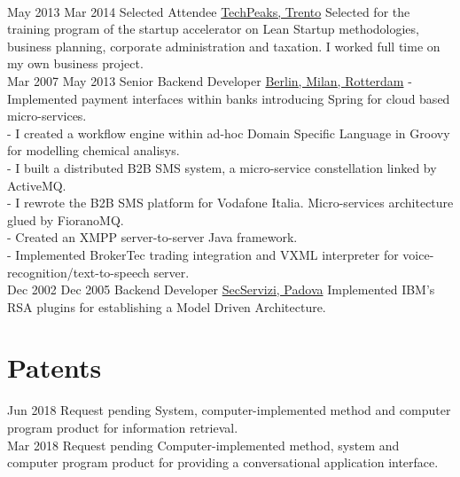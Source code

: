 \documentclass[letterpaper]{twentysecondcv} %
\begin{document}
\begin{twenty}
{{    }
        }
     \\
     \twentyitem
   		{May 2013}
		{Mar 2014}
        {Selected Attendee}
        {\href{https://www.repubblica.it/rubriche/startup-stories/2013/12/02/news/incubatore_startup-72502909/}{TechPeaks, Trento}}
        {}
        {
Selected for the training program of the startup accelerator on Lean Startup methodologies, business planning, corporate administration and taxation. I worked full time on my own business project.
    	}
    	\\
     \twentyitem
   		{Mar 2007}
		{May 2013}
        {Senior Backend Developer}
        {\href{}{Berlin, Milan, Rotterdam}}
        {}
        {
- Implemented payment interfaces within banks introducing Spring for cloud based micro-services.
        \\
- I created a workflow engine within ad-hoc Domain Specific Language in Groovy for modelling chemical analisys.
        \\
- I built a distributed B2B SMS system, a micro-service constellation linked by ActiveMQ.
        \\
- I rewrote the B2B SMS platform for Vodafone Italia. Micro-services architecture glued by FioranoMQ.
        \\
- Created an XMPP server-to-server Java framework.
        \\
- Implemented BrokerTec trading integration and VXML interpreter for  voice-recognition/text-to-speech server.
	}
   	\\
     \twentyitem
   		{Dec 2002}
		{Dec 2005}
        {Backend Developer}
        {\href{}{SecServizi, Padova}}
        {}
        {
    Implemented IBM's RSA plugins for establishing a Model Driven Architecture.
       	}

\end{twenty}

\section{Patents}
\begin{twenty}
\twentyitem
	{Jun 2018}
	{}
	{}
	{Request pending}
	{
System, computer-implemented method and computer program product for information retrieval.
}{}
\\
\twentyitem
	{Mar 2018}
	{}
	{}
	{Request pending}
	{
Computer-implemented method, system and computer program product for providing a conversational application interface.
}{}
\end{twenty}
\end{document}
